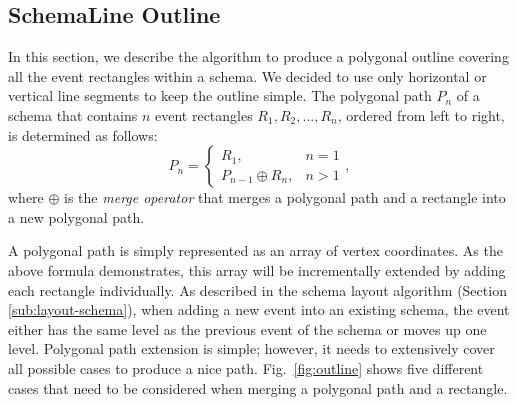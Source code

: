 %		

\subsection{SchemaLine Outline}
\label{sub:schema-outline}
In this section, we describe the algorithm to produce a polygonal outline covering all the event rectangles within a schema. We decided to use only horizontal or vertical line segments to keep the outline simple. The polygonal path $P_n$ of a schema that contains $n$ event rectangles $R_1, R_2, ..., R_n$, ordered from left to right, is determined as follows:
\[
P_n=
\begin{cases}
R_1, & n=1 \\
P_{n-1} \oplus R_n, & n > 1
\end{cases},
\]
where $\oplus$ is the \textit{merge operator} that merges a polygonal path and a rectangle into a new polygonal path. 

A polygonal path is simply represented as an array of vertex coordinates. As the above formula demonstrates, this array will be incrementally extended by adding each rectangle individually. As described in the schema layout algorithm (Section \ref{sub:layout-schema}), when adding a new event into an existing schema, the event either has the same level as the previous event of the schema or moves up one level. Polygonal path extension is simple; however, it needs to extensively cover all possible cases to produce a nice path. Fig.~\ref{fig:outline} shows five different cases that need to be considered when merging a polygonal path and a rectangle.

